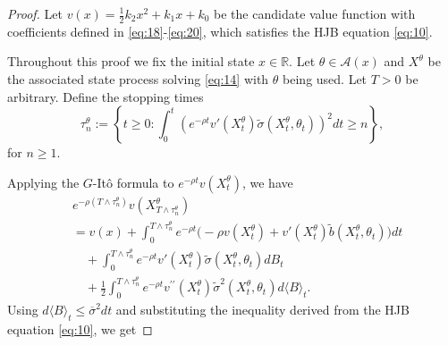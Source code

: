 \documentclass[onecolumn, journal]{IEEEtran} %
\begin{document}
	\begin{proof}
		Let $v(x) = \frac{1}{2} k_2 x^2 + k_1 x + k_0$ be the candidate value function with coefficients defined in \eqref{eq:18}-\eqref{eq:20}, which satisfies the HJB equation \eqref{eq:10}.
		
		Throughout this proof we fix the initial state \( x \in \mathbb{R} \). Let \( \theta \in \mathcal{A}(x) \) and \( X^\theta \) be the associated state process solving \eqref{eq:14} with \( \theta \) being used. Let \( T > 0 \) be arbitrary. Define the stopping times 
		\[
		\tau_n^\theta := \left\{ t \geq 0 : \int_0^t \left( e^{-\rho t} v'(X_t^\theta) \tilde{\sigma}(X_t^\theta, \theta_t) \right)^2 dt \geq n \right\},
		\] 
		for $n \geq 1$.
		
		Applying the $G$-Itô formula to $e^{-\rho t}v(X_t^\theta)$, we have
		\begin{align*}
			&e^{-\rho(T\wedge\tau_{n}^{\theta})}v(X_{T\wedge\tau_{n}^{\theta}}^{\theta}) \\
			&= v(x) + \int_{0}^{T\wedge\tau_{n}^{\theta}} e^{-\rho t} \bigg( -\rho v(X_{t}^{\theta})
			+ v'(X_t^\theta)\tilde{b}(X_t^\theta,\theta_t) \bigg) dt \\
			&\quad + \int_0^{T\wedge\tau_n^\theta} e^{-\rho t}v'(X_t^\theta)\tilde{\sigma}(X_t^\theta,\theta_t) dB_t\\
			&\quad+\frac{1}{2}\int_0^{T\wedge\tau_n^\theta}e^{-\rho t}v^{\prime\prime}(X_{t}^{\theta})\tilde{\sigma}^{2}(X_{t}^{\theta},\theta_{t})d\langle B \rangle_t.
		\end{align*}
		Using $d\langle B\rangle_t \leq \overline{\sigma}^2 dt$ and substituting the inequality derived from the HJB equation \eqref{eq:10}, we get
		

\end{proof}
\end{document}
